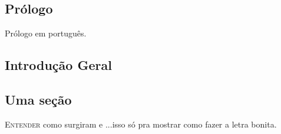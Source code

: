 \pagestyle{fancy}
\fancyhf{}
\fancyfoot[C]{\thepage}
\section{Prólogo}%



Prólogo em português.
    
\begin{refsection}
\chapter*{Introdução Geral}%



\section{Uma seção}%


%

\lettrine[lines=3]{\color{airforceblue}E}{ntender} como surgiram e ...isso só pra mostrar como fazer a letra bonita.



\end{refsection}
